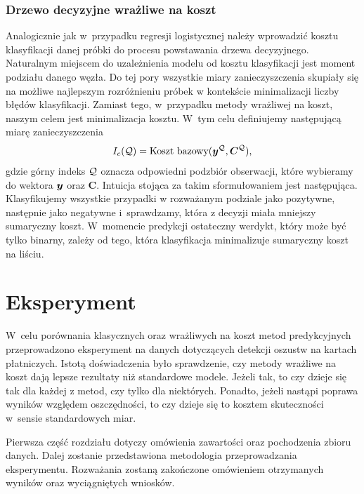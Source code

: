 \documentclass[inzynierska]{pwr_wmat_praca_dyplomowa}
\theoremstyle{plain}
\numberwithin{theorem}{chapter}
\theoremstyle{definition}
\numberwithin{theorem}{chapter}
\begin{document}
\subsection{Drzewo decyzyjne wrażliwe na koszt}
\label{csdt}
Analogicznie jak w~przypadku regresji logistycznej należy wprowadzić kosztu klasyfikacji danej próbki do procesu powstawania drzewa decyzyjnego. Naturalnym miejscem do uzależnienia modelu od kosztu klasyfikacji jest moment podziału danego węzła. Do tej pory wszystkie miary zanieczyszczenia skupiały się na możliwe najlepszym rozróżnieniu próbek w kontekście minimalizacji liczby błędów klasyfikacji. Zamiast tego, w~przypadku metody wrażliwej na koszt, naszym celem jest minimalizacja kosztu. W~tym celu definiujemy następującą miarę zanieczyszczenia
$$ I_c(\mathcal{Q}) = \text{Koszt bazowy}(\boldsymbol{y}^{\mathcal{Q}}, \boldsymbol{C}^{\mathcal{Q}}) \text{,}$$
gdzie górny indeks $\mathcal{Q}$ oznacza odpowiedni podzbiór obserwacji, które wybieramy do wektora $\boldsymbol{y}$ oraz $\boldsymbol{C}$. Intuicja stojąca za takim sformułowaniem jest następująca. Klasyfikujemy wszystkie przypadki w rozważanym podziale jako pozytywne, następnie jako negatywne i~sprawdzamy, która z decyzji miała mniejszy sumaryczny koszt. W~momencie predykcji ostateczny werdykt, który może być tylko binarny, zależy od tego, która klasyfikacja minimalizuje sumaryczny koszt na liściu.

\chapter{Eksperyment}
W~celu porównania klasycznych oraz wrażliwych na koszt metod predykcyjnych przeprowadzono eksperyment na danych dotyczących detekcji oszustw na kartach płatniczych. Istotą doświadczenia było sprawdzenie, czy metody wrażliwe na koszt dają lepsze rezultaty niż standardowe modele. Jeżeli tak, to czy dzieje się tak dla każdej z metod, czy tylko dla niektórych. Ponadto, jeżeli nastąpi poprawa wyników względem oszczędności, to czy dzieje się to kosztem skuteczności w~sensie standardowych miar. 

Pierwsza część rozdziału dotyczy omówienia zawartości oraz pochodzenia zbioru danych. Dalej zostanie przedstawiona metodologia przeprowadzania eksperymentu. Rozważania zostaną zakończone omówieniem otrzymanych wyników oraz wyciągniętych wniosków.
\end{document}
